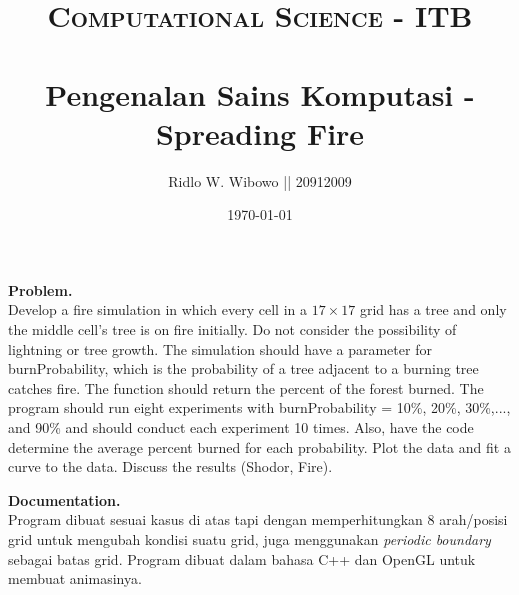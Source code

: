 \documentclass[paper=a4, fontsize=11pt]{scrartcl}
\title{	
\normalfont \normalsize 
\textsc{Computational Science - ITB} \\ [25pt] %
\horrule{0.5pt} \\[0.4cm] %
\small  Pengenalan Sains Komputasi - Spreading Fire\\ %
}
\author{\small{Ridlo W. Wibowo || 20912009}} %
\date{\normalsize\today} %
\numberwithin{equation}{section} %
\numberwithin{figure}{section} %
\numberwithin{table}{section} %
\begin{document}
\maketitle %

\large \textbf{Problem.}\\
Develop a fire simulation in which every cell in a $17 \times 17$ grid has a tree and only the middle cell's tree is on fire initially. Do not consider the possibility of lightning or tree growth. The simulation should have a parameter for burnProbability, which is the probability of a tree adjacent to a burning tree catches fire. The function should return the percent of the forest burned. The program should run eight experiments with burnProbability = 10\%, 20\%, 30\%,..., and 90\% and should conduct each experiment 10 times. Also, have the code determine the average percent burned for each probability. Plot the data and fit a curve to the data. Discuss the results (Shodor, Fire).

\vspace{2cm}
\large \textbf{Documentation.}\\
Program dibuat sesuai kasus di atas tapi dengan memperhitungkan 8 arah/posisi grid untuk mengubah kondisi suatu grid, juga menggunakan \textit{periodic boundary} sebagai batas grid. Program dibuat dalam bahasa C++ dan OpenGL untuk membuat animasinya.\\
\end{document}
